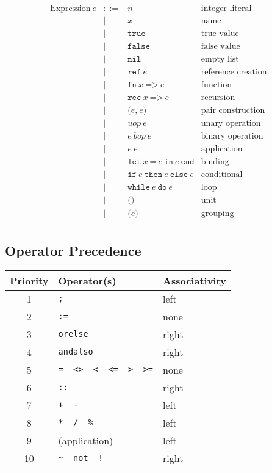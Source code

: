 \documentclass{article}
\begin{document}
\[\begin{array}{rcll}
  \mbox{Expression}\ e
    & ::= & n & \mbox{integer literal} \\
    &  |  & x & \mbox{name} \\
    &  |  & \texttt{true} & \mbox{true value} \\
    &  |  & \texttt{false} & \mbox{false value} \\
    &  |  & \texttt{nil} & \mbox{empty list} \\
    &  |  & \texttt{ref} \ e & \mbox{reference creation} \\
    &  |  & \texttt{fn} \ x \ \texttt{=>} \ e & \mbox{function} \\
    &  |  & \texttt{rec} \ x \ \texttt{=>} \ e & \mbox{recursion} \\
    &  |  & \texttt{(} e \texttt{,}\ e \texttt{)} & \mbox{pair construction} \\
    &  |  & uop\ e & \mbox{unary operation} \\
    &  |  & e\ bop\ e & \mbox{binary operation} \\
    &  |  & e\ e & \mbox{application} \\
    &  |  & \texttt{let}\ x\ \texttt{=}\ e\ \texttt{in}\ e\ \texttt{end} & \mbox{binding} \\
    &  |  & \texttt{if}\ e\ \texttt{then}\ e\ \texttt{else}\ e & \mbox{conditional} \\
    &  |  & \texttt{while}\ e\ \texttt{do}\ e & \mbox{loop} \\
    &  |  & \texttt{()} & \mbox{unit} \\
    &  |  & \texttt{(} e \texttt{)} & \mbox{grouping} \\
\end{array}\]

\subsection{Operator Precedence}

\begin{center}
\begin{tabular}{cll}
  \hline
  Priority & Operator(s) & Associativity \\
  \hline
  1 & \texttt{;} & left \\
  2 & \texttt{:=} & none \\
  3 & \texttt{orelse} & right \\
  4 & \texttt{andalso} & right \\
  5 & \texttt{= \ <> \ < \ <= \ > \ >=} & none \\
  6 & \texttt{::} & right \\
  7 & \texttt{+ \ -} & left \\
  8 & \texttt{* \ / \ \%} & left \\
  9 & (application) & left \\
  10 & \texttt{\textasciitilde\ \ not \ !} & right \\
  \hline
\end{tabular}
\end{center}
\newpage
\end{document}
